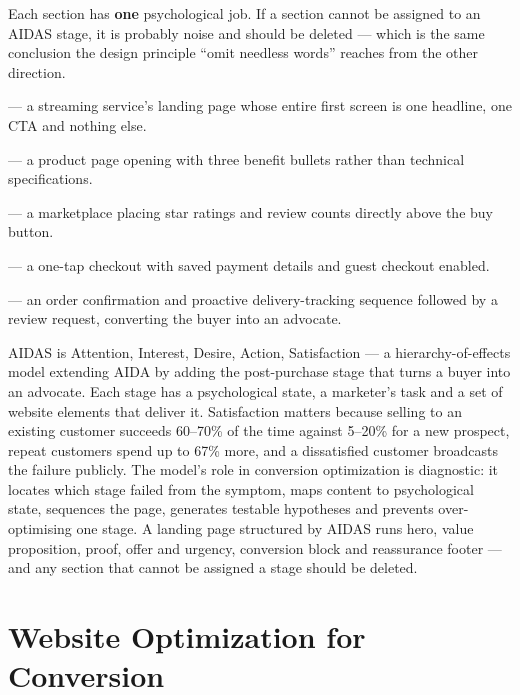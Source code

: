\documentclass{MMTextbook}
\begin{document}
\begin{keybox}
Each section has \textbf{one} psychological job. If a section cannot be assigned
to an AIDAS stage, it is probably noise and should be deleted --- which is the
same conclusion the design principle ``omit needless words'' reaches from the
other direction.
\end{keybox}

\begin{examplebox}
 --- a streaming service's landing page whose entire first screen
is one headline, one CTA and nothing else.

 --- a product page opening with three benefit bullets rather than
technical specifications.

 --- a marketplace placing star ratings and review counts directly
above the buy button.

 --- a one-tap checkout with saved payment details and guest checkout
enabled.

 --- an order confirmation and proactive delivery-tracking
sequence followed by a review request, converting the buyer into an advocate.
\end{examplebox}

\begin{summarybox}
AIDAS is Attention, Interest, Desire, Action, Satisfaction --- a
hierarchy-of-effects model extending AIDA by adding the post-purchase stage that
turns a buyer into an advocate. Each stage has a psychological state, a marketer's
task and a set of website elements that deliver it. Satisfaction matters because
selling to an existing customer succeeds 60--70\% of the time against 5--20\% for
a new prospect, repeat customers spend up to 67\% more, and a dissatisfied
customer broadcasts the failure publicly. The model's role in conversion
optimization is diagnostic: it locates which stage failed from the symptom, maps
content to psychological state, sequences the page, generates testable hypotheses
and prevents over-optimising one stage. A landing page structured by AIDAS runs
hero, value proposition, proof, offer and urgency, conversion block and
reassurance footer --- and any section that cannot be assigned a stage should be
deleted.
\end{summarybox}

\chapter{Website Optimization for Conversion}
\end{document}
